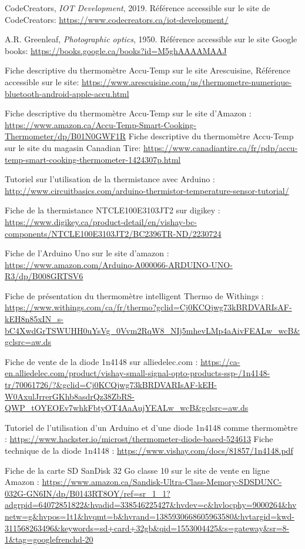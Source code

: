 \begin{thebibliographyUL}{9}
 CodeCreators, \emph{IOT Development}, 2019. Référence accessible sur le site de CodeCreators: \url{https://www.codecreators.ca/iot-development/}

 A.R. Greenleaf, \emph{Photographic optics}, 1950. Référence accessible sur le site Google books: \url{https://books.google.ca/books?id=M5ghAAAAMAAJ}

 Fiche descriptive du thermomètre Accu-Temp sur le site Arescuisine, Référence accessible sur le site: \url{https://www.arescuisine.com/us/thermometre-numerique-bluetooth-android-apple-accu.html}

 Fiche descriptive du thermomètre Accu-Temp sur le site d'Amazon : \url{https://www.amazon.ca/Accu-Temp-Smart-Cooking-Thermometer/dp/B01N0GWF1R}
Fiche descriptive du thermomètre Accu-Temp sur le site du magasin Canadian Tire:
\url{https://www.canadiantire.ca/fr/pdp/accu-temp-smart-cooking-thermometer-1424307p.html}

 Tutoriel sur l’utilisation de la thermistance avec Arduino : 
\url{http://www.circuitbasics.com/arduino-thermistor-temperature-sensor-tutorial/}

 Fiche de la thermistance NTCLE100E3103JT2 sur digikey :
\url{https://www.digikey.ca/product-detail/en/vishay-bc-components/NTCLE100E3103JT2/BC2396TR-ND/2230724}

Fiche de l’Arduino Uno sur le site d’amazon :
\url{https://www.amazon.com/Arduino-A000066-ARDUINO-UNO-R3/dp/B008GRTSV6}

Fiche de présentation du thermomètre intelligent Thermo de Withings :
\url{https://www.withings.com/ca/fr/thermo?gclid=Cj0KCQjwg73kBRDVARIsAF-kEH8n85xIN_s-bC4XwdGrTSWUHH0uYsVg_0Vvm2RqW8_NIj5mhevLMp4aAivFEALw_wcB&gclsrc=aw.ds}

 Fiche de vente de la diode 1n4148 sur alliedelec.com :
\url{https://ca-en.alliedelec.com/product/vishay-small-signal-opto-products-ssp-/1n4148-tr/70061726/?&gclid=Cj0KCQjwg73kBRDVARIsAF-kEH-W0AxulJrrerGKhb8asdrQz38ZbRS-QWP_tOYEOEv7whkFbtyOT4AaAujYEALw_wcB&gclsrc=aw.ds}

 Tutoriel de l’utilisation d’un Arduino et d’une diode 1n4148 comme thermomètre :
\url{https://www.hackster.io/microst/thermometer-diode-based-524613}
 Fiche technique de la diode 1n4148 :
\url{https://www.vishay.com/docs/81857/1n4148.pdf}

 Fiche de la carte SD SanDisk 32 Go classe 10 sur le site de vente en ligne Amazon :
\url{https://www.amazon.ca/Sandisk-Ultra-Class-Memory-SDSDUNC-032G-GN6IN/dp/B0143RT8OY/ref=sr_1_1?adgrpid=64072851822&hvadid=338546225427&hvdev=c&hvlocphy=9000264&hvnetw=g&hvpos=1t1&hvqmt=b&hvrand=1385930668605963580&hvtargid=kwd-311568263496&keywords=sd+card+32gb&qid=1553004425&s=gateway&sr=8-1&tag=googlefrenchd-20}


\end{thebibliographyUL}
